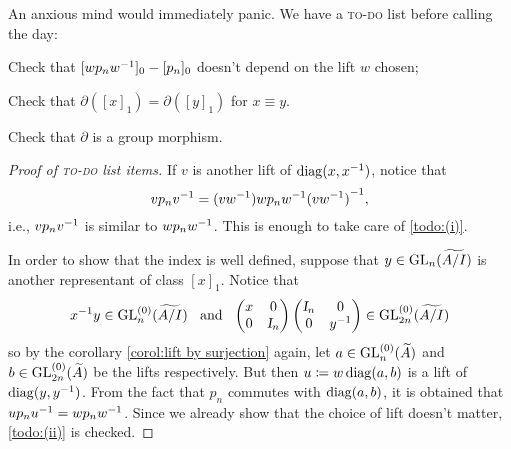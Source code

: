 An anxious mind would immediately panic. We have a \textsc{to-do} list before calling the day:
\begin{itroman}
    \item\label{todo:(i)} Check that $[wp_n {w}^{-1}]_0 - [p_n]_0$ doesn't depend on the lift $w$ chosen;
    \item\label{todo:(ii)} Check that $\partial([x]_1) = \partial([y]_1)$ for $x \equiv y$.
    \item\label{todo:(iii)} Check that $\partial$ is a group morphism.   
\end{itroman}
\begin{proof}[Proof of \textsc{to-do} list items]
    If $v$ is another lift of $\operatorname{diag}(x, {x}^{-1})$, notice that 
    $$
    vp_n {v}^{-1} = (v{w}^{-1})wp_n{w}^{-1}{(v{w}^{-1})}^{-1},
    $$
    i.e., $vp_n {v}^{-1}$ is similar to $wp_n {w}^{-1}$. This is enough to take care of \ref{todo:(i)}.

    In order to show that the index is well defined, suppose that $y \in \operatorname{GL}_n(\widetilde{A/I})$ is another representant of class $[x]_1$. Notice that 
    $$
    {x}^{-1}y \in \operatorname{GL}_n^{(0)}(\widetilde{A/I}) \hspace{0.25cm}\operatorname{and}\hspace{0.25cm} \begin{pmatrix} x & 0 \\ 0 & \textsl{I}_n\end{pmatrix}\begin{pmatrix} \textsl{I}_n & 0 \\ 0 & {y}^{-1}\end{pmatrix} \in \operatorname{GL}_{2n}^{(0)}(\widetilde{A/I})
    $$
    so by the corollary \ref{corol:lift by surjection} again, let $a \in \operatorname{GL}_n^{(0)}(\widetilde{A})$ and $b\in \operatorname{GL}_{2n}^{(0)}(\widetilde{A})$ be the lifts respectively. But then $u \coloneqq w \operatorname{diag}(a,b)$ is a lift of $\operatorname{diag}(y, {y}^{-1})$. From the fact that $p_n$ commutes with $\operatorname{diag}(a,b)$, it is obtained that $up_n {u}^{-1} = wp_n {w}^{-1}$. Since we already show that the choice of lift doesn't matter, \ref{todo:(ii)} is checked.
    

\end{proof}
